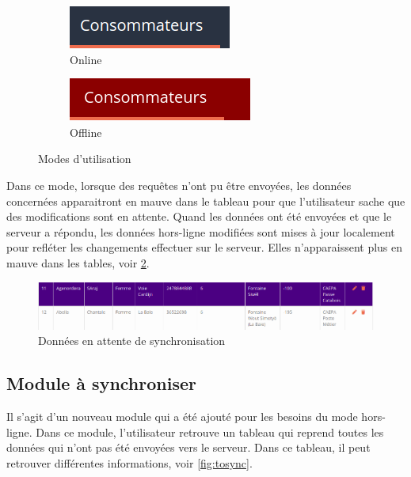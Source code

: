 \documentclass{EPL-master-thesis-covers-FR}
\begin{document}
				\begin{figure}[H]
					\label{fig:mode}
					\centering
					\begin{subfigure}[b]{0.3\textwidth}
  						\includegraphics[width=1\linewidth]{images/consumer_blue}
  						\caption{Online}
					\end{subfigure}%
					\begin{subfigure}[b]{0.333\textwidth}
  						\includegraphics[width=1\linewidth]{images/consumer_red}
  						\caption{Offline}
					\end{subfigure}
					\caption{Modes d'utilisation}
					\label{fig:test}
				\end{figure}
			
				Dans ce mode, lorsque des requêtes n'ont pu être envoyées, les données concernées apparaitront en mauve dans le tableau pour que l'utilisateur sache que des modifications sont en attente. Quand les données ont été envoyées et que le serveur a répondu, les données hors-ligne modifiées sont mises à jour localement pour refléter les changements effectuer sur le serveur. Elles n'apparaissent plus en mauve dans les tables, voir \ref{fig:purple}. 
				
				\begin{figure}[H]
					\centering
					\includegraphics[width=1\textwidth]{images/purple}
					\caption{Données en attente de synchronisation}
					\label{fig:purple}
				\end{figure}
				
							
			\subsection{Module à synchroniser}
				Il s'agit d'un nouveau module qui a été ajouté pour les besoins du mode hors-ligne. Dans ce module, l'utilisateur retrouve un tableau qui reprend toutes les données qui n'ont pas été envoyées vers le serveur. Dans ce tableau, il peut retrouver différentes informations, voir \ref{fig:tosync}.
				
\end{document}
